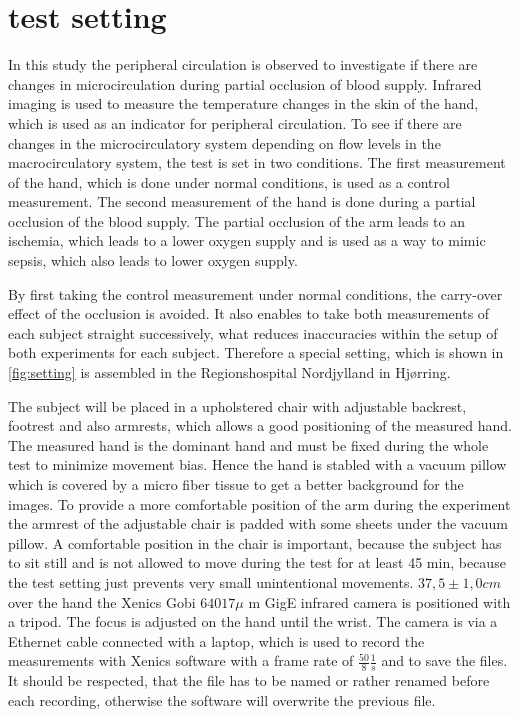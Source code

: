 \chapter{test setting}
In this study the peripheral circulation is observed to investigate if there are changes in microcirculation during partial occlusion of blood supply. Infrared imaging is used to measure the temperature changes in the skin of the hand, which is used as an indicator for peripheral circulation. 
To see if there are changes in the microcirculatory system depending on flow levels in the macrocirculatory system, the test is set in two conditions. The first measurement of the hand, which is done under normal conditions, is used as a control measurement. The second measurement of the hand is done during a partial occlusion of the blood supply. The partial occlusion of the arm leads to an ischemia, which leads to a lower oxygen supply and is used as a way to mimic sepsis, which also leads to lower oxygen supply. 

By first taking the control measurement under normal conditions, the carry-over effect of the occlusion is avoided. It also enables to take both measurements of each subject straight successively, what reduces inaccuracies within the setup of both experiments for each subject. Therefore a special setting, which is shown in \cref{fig:setting} is assembled in the Regionshospital Nordjylland in Hj\o{}rring.

The subject will be placed in a upholstered chair with adjustable backrest, footrest and also armrests, which allows a good positioning of the measured hand. The measured hand is the dominant hand and must be fixed during the whole test to minimize movement bias. Hence the hand is stabled with a vacuum pillow which is covered by a micro fiber tissue to get a better background for the images. To provide a more comfortable position of the arm during the experiment the armrest of the adjustable chair is padded with some sheets under the vacuum pillow. A comfortable position in the chair is important, because the subject has to sit still and is not allowed to move during the test for at least 45 min, because the test setting just prevents very small unintentional movements.
$37,5\pm 1,0 cm$ over the hand the Xenics Gobi $640 17\mu$ m GigE infrared camera is positioned with a tripod. The focus is adjusted on the hand until the wrist.
The camera is via a Ethernet cable connected with a laptop, which is used to record the measurements with Xenics software with a frame rate of $ \frac{50}{8} \frac{1}{s} $ and to save the files. It should be respected, that the file has to be named or rather renamed before each recording, otherwise the software will overwrite the previous file.


